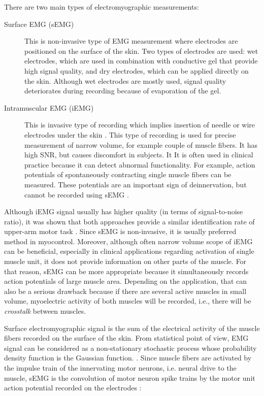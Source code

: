 There are two main types of electromyographic measurements: 
\begin{description}
\item[Surface EMG (sEMG)] This is non-invasive type of EMG measurement where electrodes are positioned on the surface of the skin. Two types of electrodes are used: wet electrodes, which are used in combination with conductive gel that provide high signal quality, and dry electrodes, which can be applied directly on the skin. Although wet electrodes are mostly used, signal quality deteriorates during recording because of evaporation of the gel.

\item[Intramuscular EMG (iEMG)] This is invasive type of recording which implies insertion of needle or wire electrodes under the skin \citep{Marateb1999}. This type of recording is used for precise measurement of narrow volume, for example couple of muscle fibers. It has high SNR, but causes discomfort in subjects. It It is often used in clinical practice because it can detect abnormal functionality. For example, action potentials of spontaneously contracting single muscle fibers can be measured. These potentials are an important sign of deinnervation, but cannot be recorded using sEMG \citep{Merletti-book}.
\end{description}

Although iEMG signal usually has higher quality (in terms of signal-to-noise ratio), it was shown that both approaches provide a similar identification rate of upper-arm motor task \citep{Hargrove2007}. Since sEMG is non-invasive, it is usually preferred method in myocontrol. Moreover, although often narrow volume scope of iEMG can be beneficial, especially in clinical applications regarding activation of single muscle unit, it does not provide information on other parts of the muscle. For that reason, sEMG can be more appropriate because it simultaneously records action potentials of large muscle area. Depending on the application, that can also be a serious drawback because if there are several active muscles in small volume, myoelectric activity of both muscles will be recorded, i.e., there will be \emph{crosstalk} between muscles. 

Surface electromyographic signal is the sum of the electrical activity of the muscle fibers recorded on the surface of the skin. From statistical point of view, EMG signal can be considered as a non-stationary stochastic process whose probability density function is the Gaussian function. \citep{DeLuca1984, DeLuca1979}. Since muscle fibers are activated by the impulse train of the innervating motor neurons, i.e. neural drive to the muscle, sEMG is the convolution of motor neuron spike trains by the motor unit action potential recorded on the electrodes \citep{Farina2010, Farina2014}:

